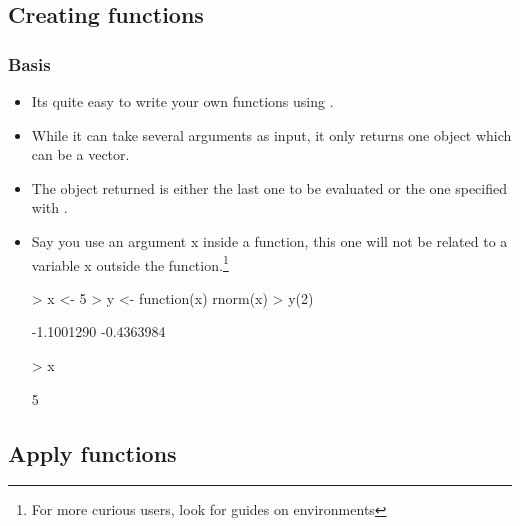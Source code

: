 \subsection{Creating functions}

\begin{frame}
  \frametitle{Basis}
  \begin{itemize}
  \item Its quite easy to write your own  functions using .
  \item While it can take several arguments as input, it only returns \alert{one} object which can be a vector.
  \item The object returned is either the last one to be evaluated or the one specified with . 
  \item Say you use an argument x inside a function, this one will not be related to a variable x outside the function.\footnote{For more curious users, look for guides on environments}
\begin{Schunk}
\begin{Sinput}
> x <- 5
> y <- function(x) rnorm(x)
> y(2)
\end{Sinput}
\begin{Soutput}
[1] -1.1001290 -0.4363984
\end{Soutput}
\begin{Sinput}
> x
\end{Sinput}
\begin{Soutput}
[1] 5
\end{Soutput}
\end{Schunk}
  \end{itemize}
\end{frame}

\subsection{Apply functions}

